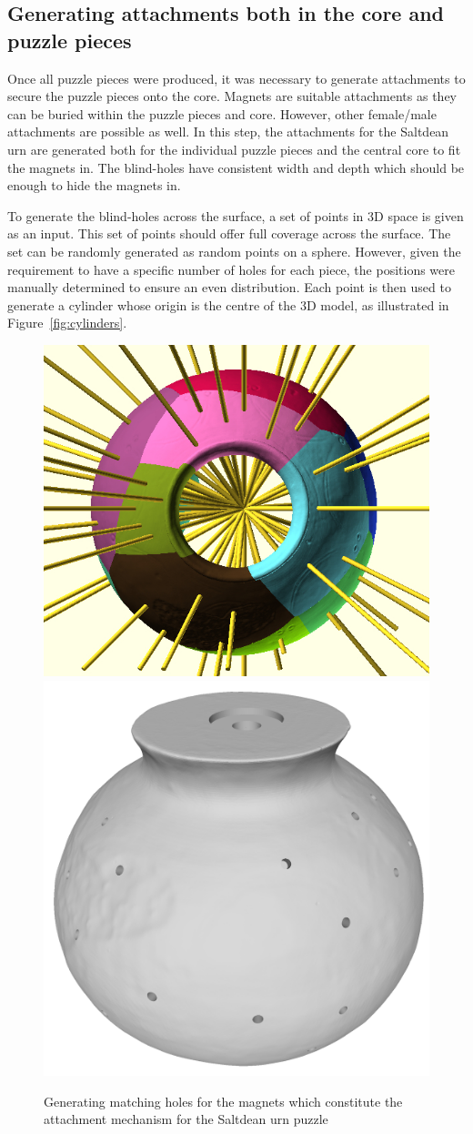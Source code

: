 \documentclass[acmlarge,screen,dvipsnames]{acmart}
\begin{document}


\subsection{Generating attachments both in the core and puzzle pieces}

Once all puzzle pieces were produced, it was necessary to generate
attachments to secure the puzzle pieces onto the core. Magnets are
suitable attachments as they can be buried within the puzzle pieces
and core. However, other female/male attachments are possible as
well. In this step, the attachments for the Saltdean urn are generated
both for the individual puzzle pieces and the central core to fit the
magnets in. The blind-holes have consistent width and depth which
should be enough to hide the magnets in.

To generate the blind-holes across the surface, a set of points in 3D
space is given as an input. This set of points should offer full
coverage across the surface. The set can be randomly generated as
random points on a sphere. However, given the requirement to have a
specific number of holes for each piece, the positions were manually
determined to ensure an even distribution. Each point is then used to
generate a cylinder whose origin is the centre of the 3D model, as
illustrated in Figure~\ref{fig:cylinders}.
%
\begin{figure}[htb]
  \centering
  {\includegraphics[width=0.45\linewidth]{images/allcylinders.jpg}}
  {\includegraphics[width=0.45\linewidth]{images/coreholes}}
 \caption{Generating matching holes for the magnets which constitute the attachment mechanism for the Saltdean urn puzzle}
\end{figure}
\end{document}
